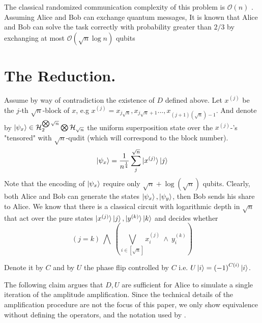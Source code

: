 \documentclass{article}
\newcommand{\commentt}[1]{\textcolor{blue}{ \textbf{[COMMENT]} #1}}
\newcommand{\ctt}[1]{\commentt{#1}}
\newcommand{\onotation}[1]{\(\mathcal{O} \left( {#1}  \right) \)}
\newcommand{\ona}[1]{\onotation{#1}}
\begin{document}
The classical randomized communication complexity of this problem is \ona{n} \cite{v003a011}.
Assuming Alice and Bob can exchange quantum messages, It is known that Alice and Bob can solve the task
correctly with probability greater than \(2/3\) by exchanging at most \ona{\sqrt{n}\log n } qubits %

\section{The Reduction.} 
Assume by way of contradiction the existence of $D$ defined above.  
Let \( x^{(j)} \) be the \(j\)-th \(\sqrt{n}\)-block of \(x\), e.g \(x^{(j)} = x_{j\sqrt{n}},x_{j\sqrt{n}+1}...,x_{(j+1)(\sqrt{n})-1}  \). And denote by \( \ket{\psi_x} \in \mathcal{H}_{2}^{\bigotimes \sqrt{n}} \bigotimes \mathcal{H}_{\sqrt{n}} \) the uniform superposition state over the \( x^{(j)}\)-'s "tensored" with \(\sqrt{n}\)-qudit (which will correspond to the block number). 
\[ \ket{\psi_x} = \frac{1}{n^\frac{1}{4}}\sum_{j}^{\sqrt{n}}\ket{x^{(j)}}\ket{j} \] Note that the encoding of \( \ket{\psi_x} \) require only \( \sqrt{n} + \log(\sqrt{n}) \) qubits.
Clearly, both Alice and Bob can generate the states \( \ket{\psi_x}, \ket{\psi_y} \), then Bob sends his share to Alice.
We know that there is a classical circuit with logarithmic depth in \( \sqrt{n} \) that act over the pure states \( \ket{x^{(j)}}\ket{j}, \ket{y^{(k)}}\ket{k} \) and decides whether \[ \left( j =  k \right) \ \bigwedge  \ \left( \bigvee_{i \in [ \sqrt{n} ] } x^{(j)}_{i} \ \wedge \  y^{(k)}_{i} \right)   \]


Denote it by \( C \) and by \( U \) the phase flip controlled by $C$ i.e. $U\ket{i}=\left( -1 \right)^{C\left( i \right)}\ket{i}$. 

The following claim argues that $D, U$ are sufficient for Alice to simulate a single iteration of the amplitude amplification. Since the technical details of the amplification procedure are not the focus of this paper, we only show equivalence without defining the operators, and the notation used by \cite{Brassard_2002}.   
\end{document}
